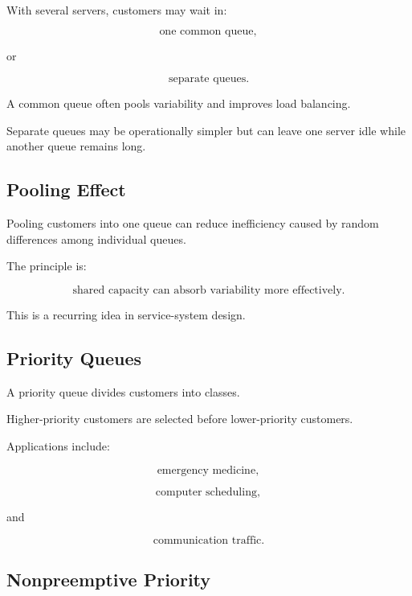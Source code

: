 With several servers, customers may wait in:

\[
\boxed{
\text{one common queue},
}
\]

or

\[
\boxed{
\text{separate queues}.
}
\]

A common queue often pools variability and improves load balancing.

Separate queues may be operationally simpler but can leave one server idle
while another queue remains long.

\subsection{Pooling Effect}
\label{subsec:queue-pooling-effect}

Pooling customers into one queue can reduce inefficiency caused by random
differences among individual queues.

The principle is:

\[
\boxed{
\text{shared capacity can absorb variability more effectively}.
}
\]

This is a recurring idea in service-system design.

\subsection{Priority Queues}
\label{subsec:priority-queues}

A priority queue divides customers into classes.

Higher-priority customers are selected before lower-priority customers.

Applications include:

\[
\boxed{
\text{emergency medicine},
}
\]

\[
\boxed{
\text{computer scheduling},
}
\]

and

\[
\boxed{
\text{communication traffic}.
}
\]

\subsection{Nonpreemptive Priority}
\label{subsec:nonpreemptive-priority}

